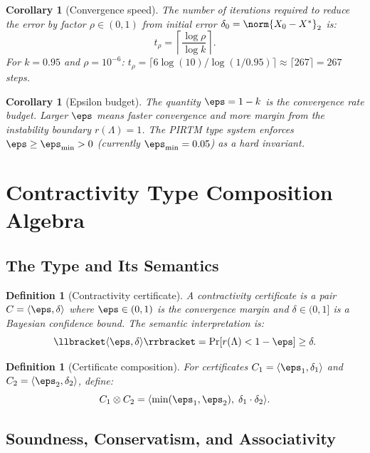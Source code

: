 \documentclass[11pt,letterpaper]{article}
\newtheorem{corollary}[theorem]{Corollary}
\newtheorem{definition}[theorem]{Definition}
\theoremstyle{remark}
\begin{document}
\begin{corollary}[Convergence speed]
\label{cor:convergence-speed}
The number of iterations required to reduce the error by factor
$\rho \in (0,1)$ from initial error $\delta_0 = \norm{X_0 - X^*}_2$
is:
\[
  t_\rho = \left\lceil \frac{\log \rho}{\log k} \right\rceil.
\]
For $k = 0.95$ and $\rho = 10^{-6}$:
$t_\rho = \lceil 6\log(10) / \log(1/0.95) \rceil \approx \lceil 267 \rceil = 267$ steps.
\end{corollary}

\begin{corollary}[Epsilon budget]
\label{cor:eps-budget}
The quantity $\eps = 1 - k$ is the \emph{convergence rate budget}.
Larger $\eps$ means faster convergence and more margin from the
instability boundary $r(\Lambda) = 1$.
The PIRTM type system enforces $\eps \geq \eps_{\min} > 0$ (currently
$\eps_{\min} = 0.05$) as a hard invariant.
\end{corollary}

\section{Contractivity Type Composition Algebra}
\label{sec:composition}

\subsection{The Type and Its Semantics}

\begin{definition}[Contractivity certificate]
\label{def:A-cert}
A \emph{contractivity certificate} is a pair $C = \langle\eps, \delta\rangle$
where $\eps \in (0,1)$ is the convergence margin and $\delta \in (0,1]$
is a Bayesian confidence bound. The semantic interpretation is:
\[
  \llbracket\langle\eps,\delta\rangle\rrbracket
  = \Pr\!\left[ r(\Lambda) < 1 - \eps \right] \geq \delta.
\]
\end{definition}

\begin{definition}[Certificate composition]
\label{def:A-compose}
For certificates $C_1 = \langle\eps_1,\delta_1\rangle$ and
$C_2 = \langle\eps_2,\delta_2\rangle$, define:
\[
  C_1 \otimes C_2 = \langle \min(\eps_1,\eps_2),\; \delta_1 \cdot \delta_2 \rangle.
\]
\end{definition}

\subsection{Soundness, Conservatism, and Associativity}
\end{document}
